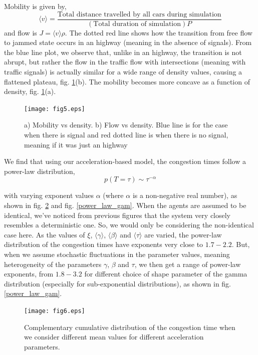 \documentclass[conference]{IEEEtran}
\begin{document}
Mobility is given by,
\[\langle v \rangle = \frac{\text{Total distance travelled by all cars during simulation}}{(\text{Total duration of simulation})P}\]
and flow is $J=\langle v \rangle \rho$. The dotted red line shows how the transition from free flow to jammed state occurs in an highway (meaning in the absence of signals). From the blue line plot, we observe that, unlike in an highway, the transition is not abrupt, but rather the flow in the traffic flow with intersections (meaning with traffic signals) is actually similar for a wide range of density values, causing a flattened plateau, fig. \ref{fund}(b). The mobility becomes more concave as a function of density, fig. \ref{fund}(a).


\begin{figure}
{    \texttt{[image: fig5.eps]}}
    \caption{a) Mobility vs density. b) Flow vs density. Blue line is for the case when there is signal and red dotted line is when there is no signal, meaning if it was just an highway}
    \label{fund}
\end{figure}

We find that using our acceleration-based model, the congestion times follow a power-law distribution, 
\begin{equation}
    p(T=\tau) \sim \tau^{-\alpha}
\end{equation}

with varying exponent values $\alpha$ (where $\alpha$ is a non-negative real number), as shown in fig. \ref{power_law_abt} and fig. \ref{power_law_gam}. When the agents are assumed to be identical, we've noticed from previous figures that the system very closely resembles a deterministic one. So, we would only be considering the non-identical case here. As the values of $\xi$, $\langle \gamma \rangle$, $\langle \beta\rangle$ and $\langle\tau \rangle$ are varied, the power-law distribution of the congestion times have exponents very close to $1.7-2.2$. But, when we assume stochastic fluctuations in the parameter values, meaning heterogeneity of the parameters $\gamma$, $\beta$ and $\tau$, we then get a range of power-law exponents, from $1.8-3.2$ for different choice of shape parameter of the gamma distribution (especially for sub-exponential distributions), as shown in fig. \ref{power_law_gam}.



\begin{figure}
{    \texttt{[image: fig6.eps]}}
    \caption{Complementary cumulative distribution of the congestion time when we consider different mean values for different acceleration parameters.}
    \label{power_law_abt}
\end{figure}
\end{document}
